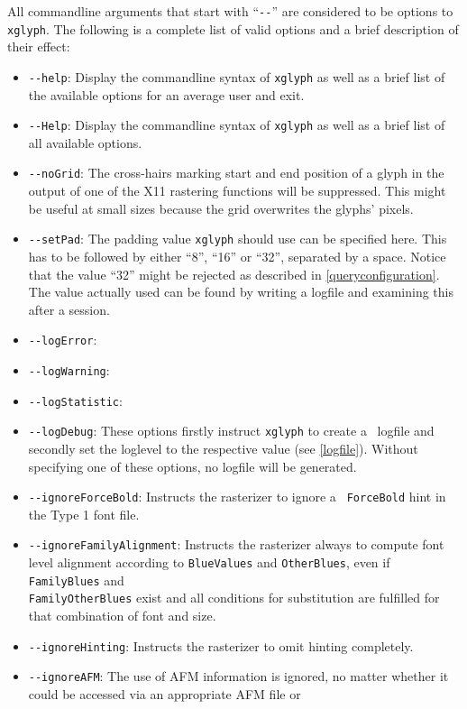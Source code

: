 All commandline arguments that start with ``\verb+--+'' are considered to be
options to \verb+xglyph+. The following is a complete list of valid options
and a brief description of their effect:
\begin{itemize}
\item\verb+--help+: Display the commandline syntax of \verb+xglyph+ as well as
  a brief list of the available options for an average user and exit.
\item\verb+--Help+: Display the commandline syntax of \verb+xglyph+ as well as
  a brief list of all available options.
\item\verb+--noGrid+: The cross-hairs marking start and end position of a
  glyph in the output of one of the X11 rastering functions will be
  suppressed. This might be useful at small sizes because the grid overwrites
  the glyphs' pixels.
\item\verb+--setPad+: The padding value \verb+xglyph+ should use can be
  specified here. This has to be followed by either ``8'', ``16'' or ``32'',
  separated by a space. Notice that the value ``32'' might be rejected as
  described in \ref{queryconfiguration}. The value actually used can be found
  by writing a logfile and examining this after a session.
\item\verb+--logError+:
\item\verb+--logWarning+:
\item\verb+--logStatistic+:
\item\verb+--logDebug+: These options firstly instruct \verb+xglyph+ to create
  a \tonelib\ logfile and secondly set the loglevel to the respective value
  (see \ref{logfile}). Without specifying one of these options, no logfile
  will be generated.
\item\verb+--ignoreForceBold+: Instructs the rasterizer to ignore a {\tt
    ForceBold} hint in the Type 1 font file.   
\item\verb+--ignoreFamilyAlignment+: Instructs the rasterizer always to
  compute font level alignment according to \verb+BlueValues+ and
  \verb+OtherBlues+, even if \verb+FamilyBlues+ and \\
  \verb+FamilyOtherBlues+
  exist and all conditions for substitution are fulfilled for that combination
  of font and size.
\item\verb+--ignoreHinting+: Instructs the rasterizer to omit hinting completely.
\item\verb+--ignoreAFM+: The use of AFM information is ignored, no matter
  whether it could be accessed via an appropriate AFM file or

\end{itemize}

